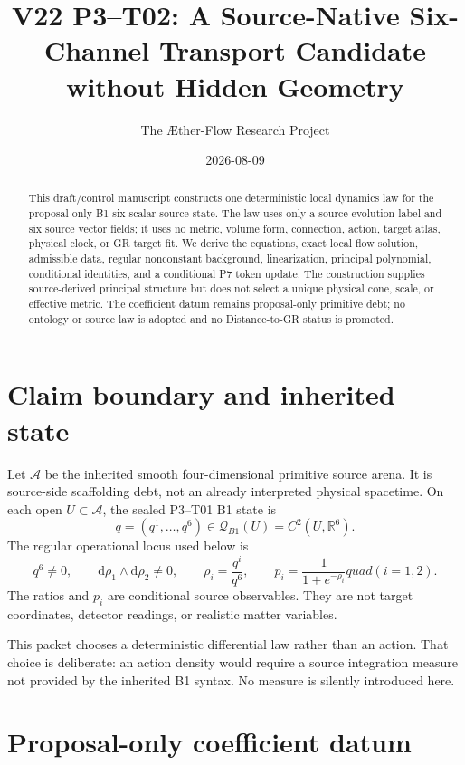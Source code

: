 \documentclass[11pt]{article}
\title{V22 P3--T02: A Source-Native Six-Channel Transport Candidate\\without Hidden Geometry}
\author{The \AE ther-Flow Research Project}
\date{2026-08-09}
\newcommand{\A}{\mathcal A}
\newcommand{\Q}{\mathcal Q}
\newcommand{\R}{\mathbb R}
\newcommand{\dd}{\mathrm d}
\begin{document}
\maketitle

\begin{abstract}
This draft/control manuscript constructs one deterministic local dynamics law
for the proposal-only B1 six-scalar source state.  The law uses only a source
evolution label and six source vector fields; it uses no metric, volume form,
connection, action, target atlas, physical clock, or GR target fit.  We derive
the equations, exact local flow solution, admissible data, regular nonconstant
background, linearization, principal polynomial, conditional identities, and
a conditional P7 token update.  The construction supplies source-derived
principal structure but does not select a unique physical cone, scale, or
effective metric.  The coefficient datum remains proposal-only primitive
debt; no ontology or source law is adopted and no Distance-to-GR status is
promoted.
\end{abstract}

\section{Claim boundary and inherited state}

Let $\A$ be the inherited smooth four-dimensional primitive source arena.  It
is source-side scaffolding debt, not an already interpreted physical
spacetime.  On each open $U\subset\A$, the sealed P3--T01 B1 state is
\begin{equation}
  q=(q^1,\ldots,q^6)\in\Q_{B1}(U)=C^2(U,\R^6).
  \label{eq:B1state}
\end{equation}
The regular operational locus used below is
\begin{equation}
  q^6\ne0,
  \qquad
  \dd\rho_1\wedge\dd\rho_2\ne0,
  \qquad
  \rho_i=\frac{q^i}{q^6},
  \qquad
  p_i=\frac{1}{1+e^{-\rho_i}}quad(i=1,2).
  \label{eq:regular}
\end{equation}
The ratios and $p_i$ are conditional source observables.  They are not target
coordinates, detector readings, or realistic matter variables.

This packet chooses a deterministic differential law rather than an action.
That choice is deliberate: an action density would require a source
integration measure not provided by the inherited B1 syntax.  No measure is
silently introduced here.

\section{Proposal-only coefficient datum}
\end{document}
